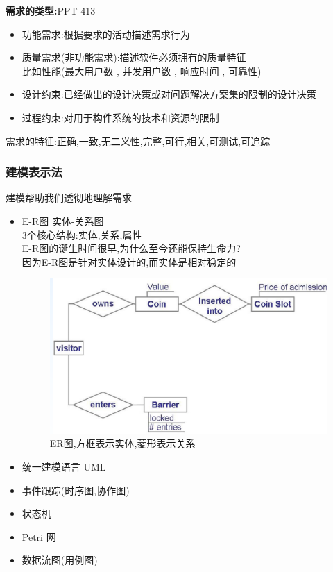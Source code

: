 \documentclass[UTF8,a4paper]{ctexart}
\begin{document}
\textbf{需求的类型:}PPT 413
\begin{itemize}
  \item 功能需求:根据要求的活动描述需求行为
  \item 质量需求(非功能需求):描述软件必须拥有的质量特征\\
  比如性能(最大用户数 , 并发用户数 , 响应时间 , 可靠性)
  \item 设计约束:已经做出的设计决策或对问题解决方案集的限制的设计决策
  \item 过程约束:对用于构件系统的技术和资源的限制
\end{itemize}

需求的特征:正确,一致,无二义性,完整,可行,相关,可测试,可追踪


\subsubsection{建模表示法}
建模帮助我们透彻地理解需求
\begin{itemize}
  \item E-R图 实体-关系图\\
  3个核心结构:实体,关系,属性\\
  E-R图的诞生时间很早,为什么至今还能保持生命力?\\
  因为E-R图是针对实体设计的,而实体是相对稳定的
  \begin{figure}[H]
    \centering
    \includegraphics[scale = 0.3]{assets/SoftwareEngineering_86691.png}
    \caption{ER图,方框表示实体,菱形表示关系}
  \end{figure}
  \item 统一建模语言 UML

  \item 事件跟踪(时序图,协作图)
  \item 状态机
  \item Petri 网
  \item 数据流图(用例图)
\end{itemize}
\end{document}
